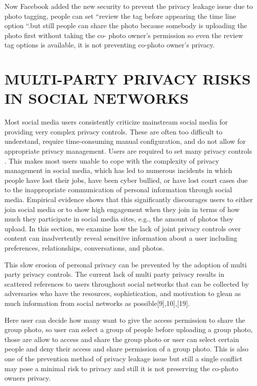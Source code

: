   \vspace*{1pc}
Now Facebook added the new security to prevent the privacy leakage issue due to photo tagging, people can set “review the tag before appearing the time line option “.but still people can share the photo because somebody is uploading the photo first without taking the co- photo owner’s permission so even the review tag options is available,  it  is not preventing co-photo owner’s privacy. 
\section[Multy Party Privacy Risks In Social Networks]{\fontsize{14}{12}\selectfont MULTI-PARTY PRIVACY RISKS IN SOCIAL NETWORKS}
Most social media users consistently criticize mainstream social media for providing very complex privacy controls. These are often too difficult to understand, require time-consuming manual configuration, and do not allow for appropriate privacy management. Users are required to set many privacy controls . This makes most users unable to cope with the complexity of privacy management in social media, which has led to numerous incidents in which people have lost their jobs, have been cyber bullied, or have lost court cases due to the inappropriate communication of personal information through social media. Empirical evidence shows that  this  significantly  discourages  users  to  either  join  social media  or  to  show  high  engagement  when  they  join in terms of how much they participate in social media sites, e.g., the  amount  of  photos  they  upload. In this section, we examine how the lack of joint privacy controls over content can inadvertently reveal sensitive information about a user including preferences, relationships, conversations, and photos.

  \vspace*{1pc}
This slow erosion of personal privacy can be prevented by the adoption of multi party privacy controls. The current lack of multi party privacy results in scattered references to users throughout social networks that can be collected by adversaries who have the resources, sophistication, and motivation to glean as much information from social networks as possible[9],10],[19]. 

  \vspace*{1pc}
Here user can decide how many want to give the access permission to share the group photo, so user  can select a group of people before uploading a group photo, those are allow to access and share the group photo or user can select certain people and deny  their access and share permission of a group photo. This is also one of the prevention method of privacy leakage issue but still a single conflict may pose a minimal risk to privacy and  still it is not preserving the co-photo owners privacy.

